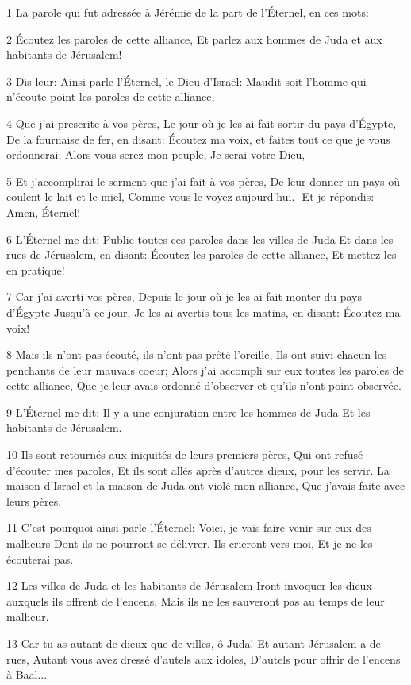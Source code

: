 \par 1 La parole qui fut adressée à Jérémie de la part de l'Éternel, en ces mots:
\par 2 Écoutez les paroles de cette alliance, Et parlez aux hommes de Juda et aux habitants de Jérusalem!
\par 3 Dis-leur: Ainsi parle l'Éternel, le Dieu d'Israël: Maudit soit l'homme qui n'écoute point les paroles de cette alliance,
\par 4 Que j'ai prescrite à vos pères, Le jour où je les ai fait sortir du pays d'Égypte, De la fournaise de fer, en disant: Écoutez ma voix, et faites tout ce que je vous ordonnerai; Alors vous serez mon peuple, Je serai votre Dieu,
\par 5 Et j'accomplirai le serment que j'ai fait à vos pères, De leur donner un pays où coulent le lait et le miel, Comme vous le voyez aujourd'hui. -Et je répondis: Amen, Éternel!
\par 6 L'Éternel me dit: Publie toutes ces paroles dans les villes de Juda Et dans les rues de Jérusalem, en disant: Écoutez les paroles de cette alliance, Et mettez-les en pratique!
\par 7 Car j'ai averti vos pères, Depuis le jour où je les ai fait monter du pays d'Égypte Jusqu'à ce jour, Je les ai avertis tous les matins, en disant: Écoutez ma voix!
\par 8 Mais ils n'ont pas écouté, ils n'ont pas prêté l'oreille, Ils ont suivi chacun les penchants de leur mauvais coeur; Alors j'ai accompli sur eux toutes les paroles de cette alliance, Que je leur avais ordonné d'observer et qu'ils n'ont point observée.
\par 9 L'Éternel me dit: Il y a une conjuration entre les hommes de Juda Et les habitants de Jérusalem.
\par 10 Ils sont retournés aux iniquités de leurs premiers pères, Qui ont refusé d'écouter mes paroles, Et ils sont allés après d'autres dieux, pour les servir. La maison d'Israël et la maison de Juda ont violé mon alliance, Que j'avais faite avec leurs pères.
\par 11 C'est pourquoi ainsi parle l'Éternel: Voici, je vais faire venir sur eux des malheurs Dont ils ne pourront se délivrer. Ils crieront vers moi, Et je ne les écouterai pas.
\par 12 Les villes de Juda et les habitants de Jérusalem Iront invoquer les dieux auxquels ils offrent de l'encens, Mais ils ne les sauveront pas au temps de leur malheur.
\par 13 Car tu as autant de dieux que de villes, ô Juda! Et autant Jérusalem a de rues, Autant vous avez dressé d'autels aux idoles, D'autels pour offrir de l'encens à Baal...
